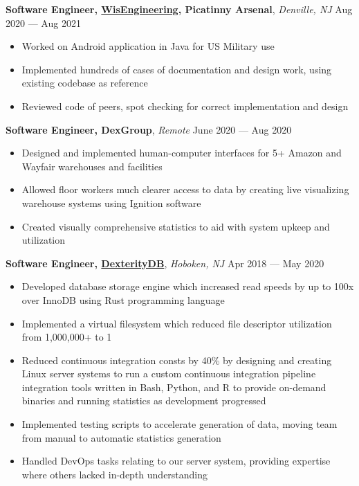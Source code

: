 \documentclass[10pt,letterpaper,roman]{moderncv}
\begin{document}
\hfill



\textbf{Software Engineer, \href{https://wisengineering.com/}{WisEngineering}, Picatinny Arsenal},
\textit{Denville, NJ} \hfill Aug 2020 --- Aug 2021
\begin{itemize}
\item Worked on Android application in Java for US Military use
\item Implemented hundreds of cases of documentation and design work, using existing codebase as reference
\item Reviewed code of peers, spot checking for correct implementation and design
\end{itemize}

\hfill

\textbf{Software Engineer, DexGroup}, \textit{Remote} \hfill June 2020 --- Aug 2020
\begin{itemize}
\item Designed and implemented human-computer interfaces for 5+ Amazon and Wayfair warehouses
  and facilities
\item Allowed floor workers much clearer access to data by creating live
  visualizing warehouse systems using Ignition software
\item Created visually comprehensive statistics to aid with system upkeep and
  utilization
\end{itemize}

\hfill

\textbf{Software Engineer, \href{https://dexteritydb.com}{DexterityDB}},
\textit{Hoboken, NJ} \hfill Apr 2018 --- May 2020
\begin{itemize}
\item Developed database storage engine which increased read speeds by up to 100x over InnoDB using Rust programming language
\item Implemented a virtual filesystem which reduced file descriptor utilization
  from 1,000,000+ to 1
\item Reduced continuous integration consts by 40\% by designing and creating
  Linux server systems to run a custom continuous integration pipeline
  integration tools written in Bash, Python, and R to provide on-demand binaries
  and running statistics as development progressed
\item Implemented testing scripts to accelerate generation of data, moving team from manual to automatic statistics generation
\item Handled DevOps tasks relating to our server system, providing expertise
  where others lacked in-depth understanding
\end{itemize}
\end{document}
